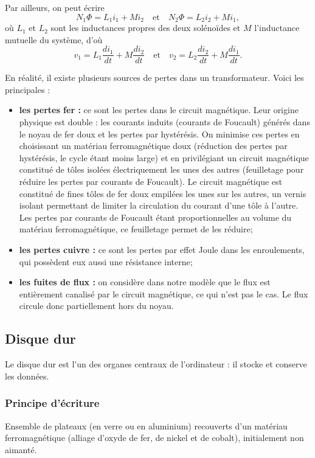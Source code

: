 \documentclass[11pt,a4paper]{report}
\begin{document}
Par ailleurs, on peut écrire
\begin{equation}
	N_1\Phi = L_1 i_1 + M i_2 \quad\text{et}\quad N_2\Phi = L_2 i_2 + M i_1,
\end{equation}
où $L_1$ et $L_2$ sont les inductances propres des deux solénoïdes et $M$ l'inductance mutuelle du système, d'où
\begin{equation}
	v_1 = L_1 \frac{d i_1}{dt} + M \frac{d i_2}{dt} 
	\quad\text{et}\quad
	v_2 = L_2 \frac{d i_2}{dt} + M \frac{d i_1}{dt}.
\end{equation}

En réalité, il existe plusieurs sources de pertes dans un transformateur. Voici les principales :
\begin{itemize}
	\item \textbf{les pertes fer :} ce sont les pertes dans le circuit magnétique. Leur origine physique est double : les courants induits (courants de Foucault) générés dans le noyau de fer doux et les pertes par hystérésis. On minimise ces pertes en choisissant un matériau ferromagnétique doux (réduction des pertes par hystérésis, le cycle étant moins large) et en privilégiant un circuit magnétique constitué de tôles isolées électriquement les unes des autres (feuilletage pour réduire les pertes par courants de Foucault). Le circuit magnétique est constitué de fines tôles de fer doux empilées les unes sur les autres, un vernis isolant permettant de limiter la circulation du courant d'une tôle à l'autre. Les pertes par courants de Foucault étant proportionnelles au volume du matériau ferromagnétique, ce feuilletage permet de les réduire;
	\item \textbf{les pertes cuivre :} ce sont les pertes par effet Joule dans les enroulements, qui possèdent eux aussi une résistance interne;
	\item \textbf{les fuites de flux :} on considère dans notre modèle que le flux est entièrement canalisé par le circuit magnétique, ce qui n'est pas le cas. Le flux circule donc partiellement hors du noyau.
\end{itemize}

\subsection{Disque dur}

Le disque dur est l'un des organes centraux de l'ordinateur : il stocke et conserve les données.

\subsubsection{Principe d'écriture}
Ensemble de plateaux (en verre ou en aluminium) recouverts d'un matériau ferromagnétique (alliage d'oxyde de fer, de nickel et de cobalt), initialement non aimanté.
\end{document}
